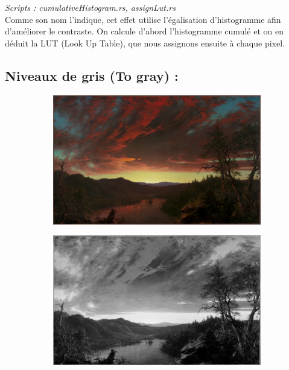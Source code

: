 \emph{Scripts : cumulativeHistogram.rs, assignLut.rs} 
\\

Comme son nom l'indique, cet effet utilise l'égalisation d'histogramme afin d'améliorer le contraste.
On calcule d'abord l'histogramme cumulé et on en déduit la LUT (Look Up Table), que nous assignons ensuite à chaque pixel.
\\

\subsection{Niveaux de gris (To gray) :}

\begin{figure}[!h]
    \centering
    \begin{subfigure}[b]{0.3\textwidth}
        \includegraphics[width=1\textwidth]{report_src/effects/original1.jpeg}
    \end{subfigure}
    \begin{subfigure}[b]{0.3\textwidth}
        \includegraphics[width=1\textwidth]{report_src/effects/to_gray.jpeg}
    \end{subfigure}
\end{figure} 

